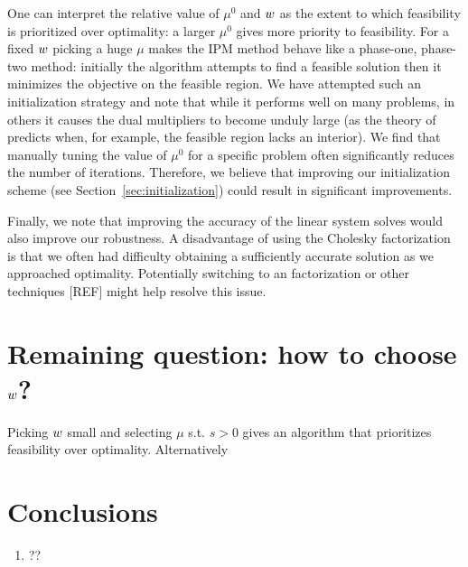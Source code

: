 \documentclass{article}
\begin{document}
One can interpret the relative value of $\mu^0$ and $w$ as the extent to which feasibility is prioritized over optimality: a larger $\mu^0$ gives more priority to feasibility. For a fixed $w$ picking a huge $\mu$ makes the IPM method behave like a phase-one, phase-two method: initially the algorithm attempts to find a feasible solution then it minimizes the objective on the feasible region. We have attempted such an initialization strategy and note that while it performs well on many problems, in others it causes the dual multipliers to become unduly large (as the theory of \cite{haeser2017behavior} predicts when, for example, the feasible region lacks an interior). We find that manually tuning the value of $\mu^0$ for a specific problem often significantly reduces the number of iterations. Therefore, we believe that improving our initialization scheme (see Section~\ref{sec:initialization}) could result in significant improvements.


Finally, we note that improving the accuracy of the linear system solves would also improve our robustness. A disadvantage of using the Cholesky factorization is that we often had difficulty obtaining a sufficiently accurate solution as we approached optimality. Potentially switching to an \LBL{} factorization \cite{amestoy1998mumps,bunch1971direct} or other techniques [REF] might help resolve this issue.

\if{}
\section{Remaining question: how to choose $w$?}

Picking $w$ small and selecting $\mu$ s.t. $s > 0$ gives an algorithm that prioritizes feasibility over optimality. Alternatively 

\fi


\if{}


\section{Conclusions}
\begin{enumerate}
\item ??
\end{enumerate}
\end{document}
